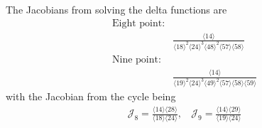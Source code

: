 \documentclass[letter,11pt]{article}
\newcommand{\J}{\mathcal{J}}
\newcommand{\ab}[1]{\langle #1 \rangle}
\begin{document}
The Jacobians from solving the delta functions are
\begin{equation}
	\begin{aligned}
		\text{Eight point}:&\\
		&\frac{\ab{14}}{\ab{18}^2\ab{24}^3\ab{48}^2\ab{57}\ab{58}}\\
		\text{Nine point}:&\\
		&\frac{\ab{14}}{\ab{19}^2\ab{24}^3\ab{49}^2\ab{57}\ab{58}\ab{59}}
	\end{aligned}
\end{equation}
with the Jacobian from the cycle being
\begin{equation}
	\begin{aligned}
		\J_8=\frac{\ab{14}\ab{28}}{\ab{18}\ab{24}},~~~~
		\J_9=\frac{\ab{14}\ab{29}}{\ab{19}\ab{24}}
	\end{aligned}
\end{equation}
\end{document}
